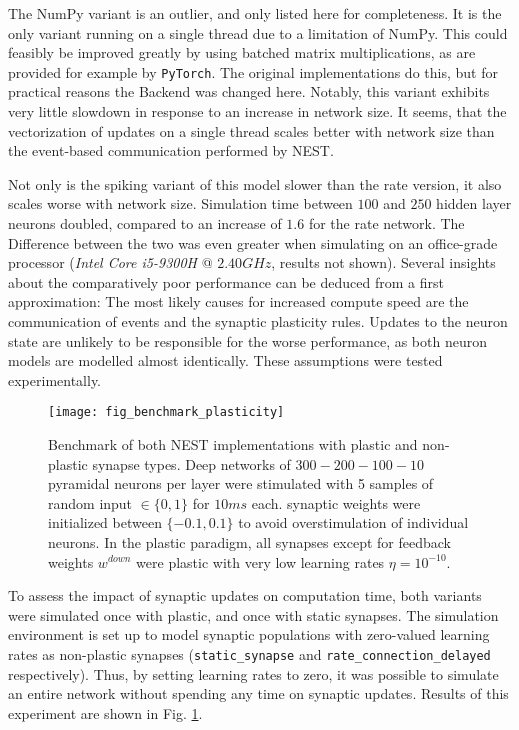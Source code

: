 The NumPy variant is an outlier, and only listed here for completeness. It is the only variant running on a single
thread due to a limitation of NumPy. This could feasibly be improved greatly by using batched matrix multiplications, as
are provided for example by \texttt{PyTorch}. The original implementations do this, but for practical reasons the
Backend was changed here. Notably, this variant exhibits very little slowdown in response to an increase in network
size. It seems, that the vectorization of updates on a single thread scales better with network size than the
event-based communication performed by NEST.

Not only is the spiking variant of this model slower than the rate version, it also scales worse with network size.
Simulation time between $100$ and $250$ hidden layer neurons doubled, compared to an increase of $1.6$ for the rate
network. The Difference between the two was even greater when simulating on an office-grade processor (\textit{Intel
Core i5-9300H} @ $2.40GHz$, results not shown). Several insights about the comparatively poor performance can be deduced
from a first approximation: The most likely causes for increased compute speed are the communication of events and the
synaptic plasticity rules. Updates to the neuron state are unlikely to be responsible for the worse performance, as both
neuron models are modelled almost identically. These assumptions were tested experimentally.



\begin{figure}[h]
    \centering
    \texttt{[image: fig\_benchmark\_plasticity]}
    \caption[Benchmark of both NEST implementations with plastic and non-plastic synapse types]{Benchmark of both NEST
        implementations with plastic and non-plastic synapse types. Deep networks of $300-200-100-10$ pyramidal neurons
        per layer were stimulated with 5 samples of random input $\in\{0,1\}$ for $10ms$ each. synaptic weights were
        initialized between $\{-0.1, 0.1 \}$ to avoid overstimulation of individual neurons. In the plastic paradigm,
        all synapses except for feedback weights $w^{down}$ were plastic with very low learning rates $\eta =
        10^{-10}$.}
    \label{fig-benchmark-plasticity}
\end{figure}


To assess the impact of synaptic updates on computation time, both variants were simulated once with plastic, and once
with static synapses. The simulation environment is set up to model synaptic populations with zero-valued learning rates
as non-plastic synapses (\texttt{static\_synapse} and \texttt{rate\_connection\_delayed} respectively). Thus, by setting
learning rates to zero, it was possible to simulate an entire network without spending any time on synaptic updates.
Results of this experiment are shown in Fig. \ref{fig-benchmark-plasticity}.

